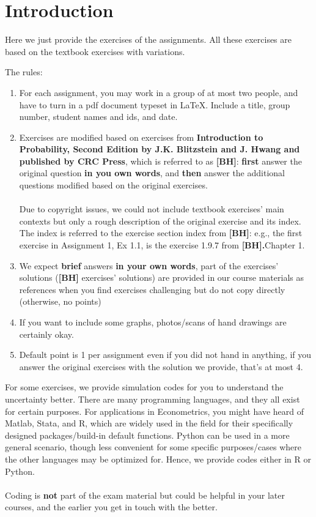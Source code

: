 \section*{Introduction}

Here we just provide the exercises of the assignments. All these exercises are based on the textbook exercises with variations. 


The rules:
\begin{enumerate}
	\item For each assignment, you may work in a group of at most two people, and have to turn in a pdf document typeset in \LaTeX{}. Include a title, group number, student names and ids, and date.
	\item Exercises are modified based on exercises from \textbf{Introduction to Probability, Second Edition by J.K. Blitzstein and J. Hwang and published by CRC Press}, which is referred to as \textbf{[BH]}: \textbf{first} answer the original question \textbf{in you own words}, and \textbf{then} answer the additional questions modified based on the original exercises.\\~\\ Due to copyright issues, we could not include textbook exercises' main contexts but only a rough description of the original exercise and its index. The index is referred to the exercise section index from \textbf{[BH]}: e.g., the first exercise in Assignment 1, Ex 1.1, is the exercise 1.9.7 from  \textbf{[BH].}Chapter 1. 
	\item 
	We expect \textbf{brief} answers \textbf{in your own words}, part of the exercises' solutions (\textbf{[BH]} exercises' solutions)  are provided in our course materials as references when you find exercises challenging but do not copy directly (otherwise, no points)
	\item If you want to include some graphs, photos/scans of hand drawings are certainly okay.
	\item Default point is 1 per assignment even if you did not hand in anything, if you answer the original exercises with the solution we provide, that's at most 4. 
\end{enumerate}

For some exercises, we provide simulation codes for you to understand the uncertainty better. There are many programming languages, and they all exist for certain purposes. For applications in Econometrics,  you might have heard of Matlab, Stata, and R, which are widely used in the field for their specifically designed packages/build-in default functions. Python can be used in a more general scenario,  though less convenient for some specific purposes/cases where the other languages may be optimized for. Hence, we provide codes either in R or Python.\\~\\ 
Coding is \textbf{not} part of the exam material but could be helpful in your later courses, and the earlier you get in touch with the better.  